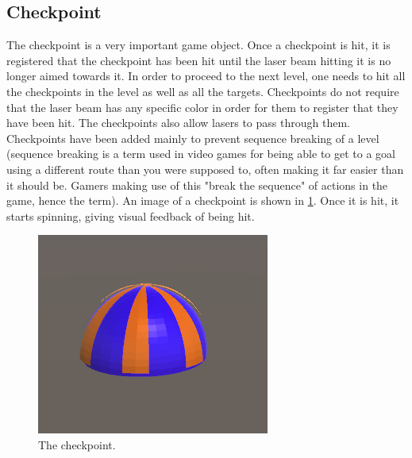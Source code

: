 		\subsection{Checkpoint}
			The checkpoint is a very important game object. Once a checkpoint is
			hit, it is registered that the checkpoint has been hit until the
			laser beam hitting it is no longer aimed towards it. In order to
			proceed to the next level, one needs to hit all the checkpoints
			in the level as well as all the targets. Checkpoints do not require
			that the laser beam has any specific color in order for them to register
			that they have been hit. The checkpoints also allow lasers to pass
			through them. Checkpoints have been added mainly to prevent sequence
			breaking of a level (sequence breaking is a term used in video games
			for being able to get to a goal using a different route than you were
			supposed to, often making it far easier than it should be. Gamers making
			use of this "break the sequence" of actions in the game, hence the term).
			An image of a checkpoint is shown in \ref{fig:checkpoint}. Once it is
			hit, it starts spinning, giving visual feedback of being hit.
			\begin{figure}[!ht]
				\centering
				\includegraphics[scale = 0.7]{Checkpoint}
				\caption{The checkpoint.}
				\label{fig:checkpoint}
			\end{figure}
			
